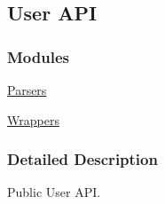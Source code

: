 \hypertarget{group___l_r_c__user_a_p_i}{
\subsection{User API}
\label{group___l_r_c__user_a_p_i}
}
\subsubsection*{Modules}
\begin{CompactItemize}
\item 
\hyperlink{group___l_r_c__parser}{Parsers}
\item 
\hyperlink{group___l_r_c__wrappers}{Wrappers}
\end{CompactItemize}


\subsubsection{Detailed Description}
Public User API. 